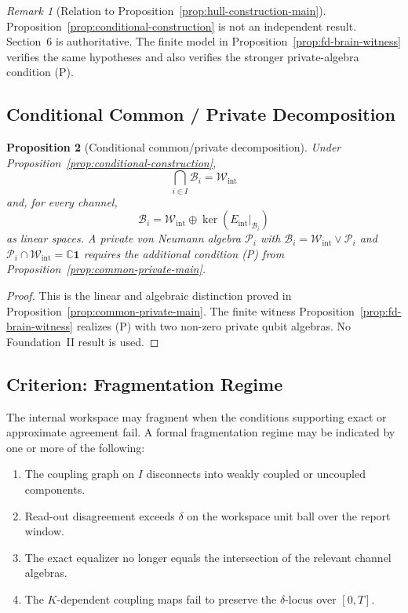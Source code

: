 \documentclass[12pt]{article}
\newtheorem{proposition}{Proposition}[section]
\theoremstyle{definition}
\theoremstyle{remark}
\newtheorem{remark}[proposition]{Remark}
\newcommand{\Wint}{\mathcal W_{\mathrm{int}}}
\begin{document}
\begin{remark}[Relation to Proposition~\ref{prop:hull-construction-main}]
Proposition~\ref{prop:conditional-construction} is not an independent
result. Section~6 is authoritative. The finite model in
Proposition~\ref{prop:fd-brain-witness} verifies the same hypotheses and
also verifies the stronger private-algebra condition (P).
\end{remark}

\subsection{Conditional Common / Private Decomposition}

\begin{proposition}[Conditional common/private decomposition]
\label{prop:common-private-appendix}
Under Proposition~\ref{prop:conditional-construction},
\[
\bigcap_{i\in I}\mathcal B_i=\Wint
\]
and, for every channel,
\[
\mathcal B_i
=\Wint\oplus\ker(E_{\mathrm{int}}|_{\mathcal B_i})
\]
as linear spaces. A private von Neumann algebra \(\mathcal P_i\) with
\(\mathcal B_i=\Wint\vee\mathcal P_i\) and
\(\mathcal P_i\cap\Wint=\mathbb C\mathbf1\) requires the additional
condition (P) from Proposition~\ref{prop:common-private-main}.
\end{proposition}

\begin{proof}
This is the linear and algebraic distinction proved in
Proposition~\ref{prop:common-private-main}. The finite witness
Proposition~\ref{prop:fd-brain-witness} realizes (P) with two non-zero
private qubit algebras. No Foundation~II result is used.
\end{proof}

\subsection{Criterion: Fragmentation Regime}

The internal workspace may fragment when the conditions supporting exact
or approximate agreement fail. A formal fragmentation regime may be
indicated by one or
more of the following:
\begin{enumerate}[label=(F\arabic*)]
\item The coupling graph on \(I\) disconnects into weakly coupled or
uncoupled components.
\item Read-out disagreement exceeds \(\delta\) on the workspace unit ball
over the report window.
\item The exact equalizer no longer equals the intersection of the
relevant channel algebras.
\item The \(K\)-dependent coupling maps fail to preserve the
\(\delta\)-locus over \([0,T]\).
\end{enumerate}
\end{document}
